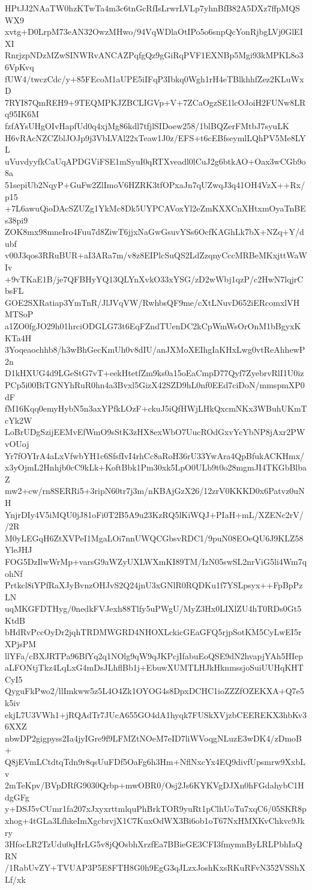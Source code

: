 HPtJJ2NAaTW0hzKTwTa4m3c6tnGcRfIsLrwrLVLp7yhnBfB82A5DXz7ffpMQSWX9
xvtg+D0LrpM73eAN32OwzMHwo/94VqWDlaOtIPo5o6snpQcYonRjbgLVj0GlEIXI
RnrjzpNDzMZwSINWRvANCAZPqfgQz9gGiRqPVF1EXNBp5Mgi93kMPKL8o36VpKvq
fUW4/twczCdc/y+85FEcoM1aUPE5iIFqP3Ibkq0Wgh1rH4eTBlkhhfZez2KLuWxD
7RYI87QmREH9+9TEQMPKJZBCLIGVp+V+7ZCaOgzSE1lcOJoiH2FUNw8LRq95IK6M
fzfAYsUHgOIvHapfUd0q4xjMg86kdl7tfjlSIDoew258/1blBQZerFMtbJ7syuLK
H6vRAcNZCZblJOJp9j3VbLVAl22xTeaw1J0z/EFS+t6cEBfseymlLQhPV5Me8LYL
uVuvdyyfkCaUqAPDGViFSE1mSyuI0qRTXveadl0lCuJ2g6btkAO+Oax3wCGb9o8a
51sepiUb2NqyP+GuFw2ZlImoV6HZRK3tfOPxaJn7qUZwqJ3q41OH4VzX++Rx/p15
+7L6awuQioDAcSZUZg1YkMc8Dk5UYPCAVoxYl2eZmKXXCnXHtxmOyaTnBEs38pi9
ZOK8mx98mneIro4Fuu7d8ZiwT6jjxNaGwGsuvYSs6OcfKAGhLk7bX+NZq+Y/dubf
v00J3qos3RRuBUR+aI3ARa7m/v8z8EIPlcSuQS2LdZzqnyCccMRBeMKxjttWaWIv
+9vTKaE1B/je7QFBHyYQ13QLYnXvkO33xYSG/zD2wWbj1qzP/c2HwN7lqjrCbsFL
GOE2SXRatiap3YmTnR/JlJVqVW/RwhbsQF9me/cXtLNuvD652iERcomxlVHMTSoP
a1ZO0fgJO29h01hrciODGLG73t6EqFZndTUenDC2kCpWmWsOrOnM1bBgyxKKTa4H
3Yoqeaochhb8/h3wBhGecKmUh0v8dIU/anJXMoXEIhgIaKHxLwg0vtReAhhewP2n
D1kHXUG4d9LGeStG7vT+eekHtetfZm9ks0a15oEaCmpD77Qyf7ZyebrvRlI1U0iz
PCp5i00BiTGNYhRuR0hn4a3Bvxl5GizX42SZD9hL0nf0EEd7ciDoN/mmspmXP0dF
fM16Kqq0emyHybN5n3axYPfkLOzF+ckuJ5iQfHWjLHkQxcmNKx3WBuhUKmTcYk2W
LoBrUDgSzijEEMvEfWmO9sStK3zHX8exWbO7UucROdGxvYcYbNP8jAxr2PWvOUoj
Yr7fOYIrA4aLxVfwbYH1c6SfsfIvI4rhCc8aRoH36rU33YwAra4QpBfukACKHmx/
x3yOjmL2Hnhjb0cC9kLk+KoftBbk1Pm30xk5LpO0ULb9t0o28mgmJI4TKGbBlbaZ
mw2+cw/rn8SERRi5+3ripN60tr7j3m/nKBAjGzX26/12zrV0KKKD0x6Patvz0uNH
YnjrDIy4V5iMQU0jJ81oFi0T2B5A9u23KzRQ5lKiWQJ+PIaH+mL/XZENc2rV//2R
M0yLEGqH6ZtXVPeI1MgaLOi7nnUWQCGbsvRDC1/9puN08EOeQU6J9KLZ58YleJHJ
FOG5DzIlwWrMp+varsG9aWZyUXLWXmKI89TM/IzN05swSL2nrViG5li4Wm7qohNf
Prtkcl8iYPfRaXJyBvnzOHJvS2Q24jnU3xGNlR0RQDKu1f7YSLpsyx++FpBpPzLN
uqMKGFDTHyg/0nedkFVJexh88Tlfy5uPWgU/MyZ3Hx0LIXlZU4hT0RDs0Gt5KtdB
bHdRvPccOyDr2jqhTRDMWGRD4NHOXLckicGEaGFQ5rjpSotKM5CyLwEI5rXPjsPM
llYFa/cBXJRTPa96BfYq2q1NOlg9qW9qJKPcjIfabuEoQSE9dN2hvapjYAh5HIep
aLFONtjTkz4LqLxG4mDsJLhflBb1j+EbuwXUMTLHJkHknmssjoSuiUUHqKHTCyI5
QyguFkPwo2/llImkww5z5L4O4Zk1OYOG4s8DpxDCHC1ioZZZfOZEKXA+Q7e5k5iv
ekjL7U3VWh1+jRQAdTr7JUcA655GO4dA1hyqk7FUSkXVjzbCEEREKX3hbKv36XXZ
nbwDP2gigpyss2Ia4jyIGre9f9LFMZtNOeM7eID7liWVoqgNLuzE3wDK4/zDmoB+
Q8jEVmLCtdtqTdn9r8qsUuFDf5OaFg6h3Hm+NflNxcYx4EQ9divfUpsmrw9XxbLv
2mTeKpv/BVpDRfG9030Qrbp+mwOBR0/Osj2Js6KYKVgDJXn0hFGdahybC1HdgGFg
y+DSJ5vCUmr1fa207xJxyxrttmlquPhBrkTOR9yuRt1pClhUoTu7xqC6/05SKR8p
xhog+4tGLa3LfhkeImXgcbrvjX1C7KuxOdWX3Bi6ob1oT67NxHMXKvChkvc9Jkry
3HfocLR2TzUdu0qHrLG5v8jQOsbhXrzfEa7BBieGE3CFI3fmymnByLRLPbhIaQRN
/1RabUvZY+TVUAP3P5E8FTH8G0h9EgG3qJLzxJoshKxsRKuRFvN352VSShXLf/xk
